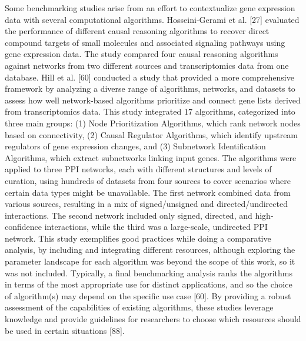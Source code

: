 Some benchmarking studies arise from an effort to contextualize gene expression data with several computational algorithms. Hosseini-Gerami et al. [27] evaluated the performance of different causal reasoning algorithms to recover direct compound targets of small molecules and associated signaling pathways using gene expression data. The study compared four causal reasoning algorithms against networks from two different sources and transcriptomics data from one database. Hill et al. [60] conducted a study that provided a more comprehensive framework by analyzing a diverse range of algorithms, networks, and datasets to assess how well network-based algorithms prioritize and connect gene lists derived from transcriptomics data. This study integrated 17 algorithms, categorized into three main groups: (1) Node Prioritization Algorithms, which rank network nodes based on connectivity, (2) Causal Regulator Algorithms, which identify upstream regulators of gene expression changes, and (3) Subnetwork Identification Algorithms, which extract subnetworks linking input genes. The algorithms were applied to three PPI networks, each with different structures and levels of curation, using hundreds of datasets from four sources to cover scenarios where certain data types might be unavailable. The first network combined data from various sources, resulting in a mix of signed/unsigned and directed/undirected interactions. The second network included only signed, directed, and high-confidence interactions, while the third was a large-scale, undirected PPI network. This study exemplifies good practices while doing a comparative analysis, by including and integrating different resources, although exploring the parameter landscape for each algorithm was beyond the scope of this work, so it was not included.
Typically, a final benchmarking analysis ranks the algorithms in terms of the most appropriate use for distinct applications, and so the choice of algorithm(s) may depend on the specific use case [60]. By providing a robust assessment of the capabilities of existing algorithms, these studies leverage knowledge and provide guidelines for researchers to choose which resources should be used in certain situations [88].
